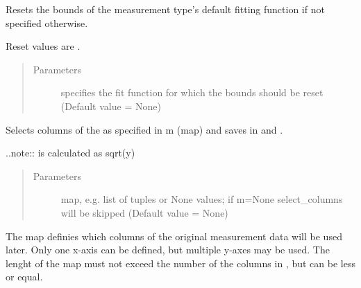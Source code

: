 \documentclass[letterpaper,10pt,english]{sphinxmanual}
\begin{document}
\begin{fulllineitems}
\begin{fulllineitems}
\label{\detokenize{measurement:measurement.Measurement.reset_bounds}}
Resets the bounds of the measurement type’s default fitting
function if not specified otherwise.

Reset values are .
\begin{quote}\begin{description}
\item[{Parameters}] \leavevmode
{} \textendash{} specifies the fit function for which the
bounds should be reset (Default value = None)

\end{description}\end{quote}

\end{fulllineitems}


\begin{fulllineitems}
\label{\detokenize{measurement:measurement.Measurement.select_columns}}
Selects columns of the  as specified in m (map) and
saves in  and .

..note::  is calculated as sqrt(y)
\begin{quote}\begin{description}
\item[{Parameters}] \leavevmode
{} \textendash{} map, e.g. list of tuples or None values; if m=None
select\_columns will be skipped (Default value = None)

\end{description}\end{quote}

The map  definies which columns of the original measurement
data will be used later. Only one x-axis can be defined, but multiple
y-axes may be used. The lenght of the map must not exceed the number
of the columns in , but can be less or equal.


\end{fulllineitems}
\end{fulllineitems}
\end{document}
